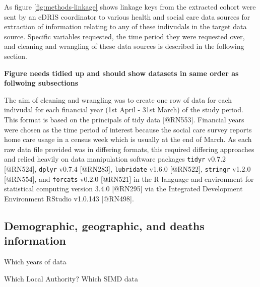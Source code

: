 \documentclass[]{article}
\begin{document}
As figure \ref{fig:methods-linkage} shows linkage keys from the
extracted cohort were sent by an eDRIS coordinator to various health and
social care data sources for extraction of information relating to any
of these indivudals in the target data source. Specific variables
requested, the time period they were requested over, and cleaning and
wrangling of these data sources is described in the following section.

\textbf{Figure needs tidied up and should show datasets in same order as
follwoing subsections}

The aim of cleaning and wrangling was to create one row of data for each
indivudal for each financial year (1st April - 31st March) of the study
period. This format is based on the principals of tidy data
{[}@RN553{]}. Financial years were chosen as the time period of interest
because the social care survey reports home care usage in a census week
which is usually at the end of March. As each raw data file provided was
in differing formats, this required differing approaches and relied
heavily on data manipulation software packages \texttt{tidyr} v0.7.2
{[}@RN524{]}, \texttt{dplyr} v0.7.4 {[}@RN283{]}, \texttt{lubridate}
v1.6.0 {[}@RN522{]}, \texttt{stringr} v1.2.0 {[}@RN554{]}, and
\texttt{forcats} v0.2.0 {[}@RN521{]} in the R language and environment
for statistical computing version 3.4.0 {[}@RN295{]} via the Integrated
Development Environment RStudio v1.0.143 {[}@RN498{]}.

\FloatBarrier

\subsection{Demographic, geographic, and deaths information}\label{subsubsec:nrs-summs}

Which years of data

Which Local Authority? Which SIMD data

\begin{table}[h]
\centering
\caption{Demographic file data}
\label{tab:demos}
\end{table}
\end{document}

